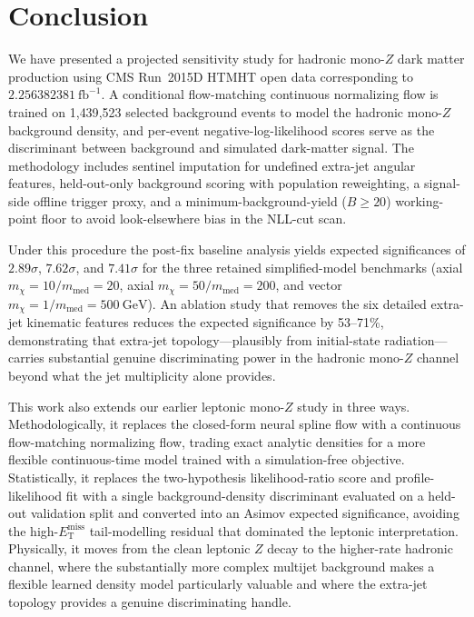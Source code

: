 \documentclass[11pt,a4paper,twocolumn]{article}
\newcommand{\GeV}{\text{GeV}}
\newcommand{\MET}{\ensuremath{E_{\mathrm{T}}^{\mathrm{miss}}}}
\newcommand{\invfb}{\ensuremath{\mathrm{fb}^{-1}}}
\begin{document}
\section{Conclusion}

We have presented a projected sensitivity study for hadronic mono-$Z$ dark
matter production using CMS Run~2015D HTMHT open data corresponding to
$2.256382381~\invfb$. A conditional flow-matching continuous normalizing
flow is trained on 1{,}439{,}523 selected background events to model the
hadronic mono-$Z$ background density, and per-event negative-log-likelihood
scores serve as the discriminant between background and simulated
dark-matter signal. The methodology includes sentinel imputation for
undefined extra-jet angular features, held-out-only background scoring with
population reweighting, a signal-side offline trigger proxy, and a
minimum-background-yield ($B\geq20$) working-point floor to avoid
look-elsewhere bias in the NLL-cut scan.

Under this procedure the post-fix baseline analysis yields expected
significances of $2.89\sigma$, $7.62\sigma$, and $7.41\sigma$ for the three
retained simplified-model benchmarks (axial $m_\chi=10/m_{\mathrm{med}}=20$,
axial $m_\chi=50/m_{\mathrm{med}}=200$, and vector
$m_\chi=1/m_{\mathrm{med}}=500~\GeV$). An ablation study that removes the
six detailed extra-jet kinematic features reduces the expected significance
by 53--71\%, demonstrating that extra-jet topology---plausibly from
initial-state radiation---carries substantial genuine discriminating power
in the hadronic mono-$Z$ channel beyond what the jet multiplicity alone
provides.

This work also extends our earlier leptonic mono-$Z$ study
\cite{rasineni_nsf_monoz} in three ways. Methodologically, it replaces the
closed-form neural spline flow with a continuous flow-matching normalizing
flow, trading exact analytic densities for a more flexible continuous-time
model trained with a simulation-free objective. Statistically, it replaces
the two-hypothesis likelihood-ratio score and profile-likelihood fit with a
single background-density discriminant evaluated on a held-out validation
split and converted into an Asimov expected significance, avoiding the
high-\MET{} tail-modelling residual that dominated the leptonic
interpretation. Physically, it moves from the clean leptonic $Z$ decay to
the higher-rate hadronic channel, where the substantially more complex
multijet background makes a flexible learned density model particularly
valuable and where the extra-jet topology provides a genuine discriminating
handle.
\end{document}
